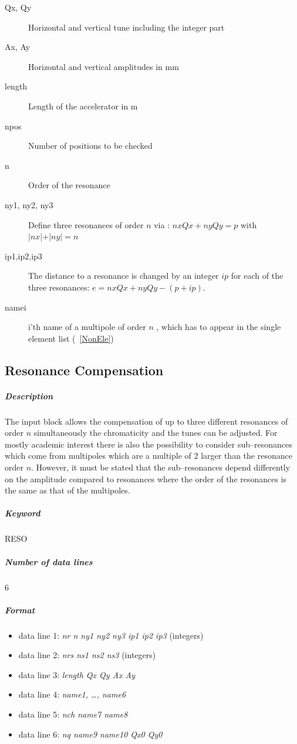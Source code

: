 \documentclass[a4paper,11pt]{report}
\begin{document}
\begin{description}
\item [Qx, Qy] Horizontal and vertical tune including the integer part
\item [Ax, Ay] Horizontal and vertical amplitudes in mm
\item [length] Length of the accelerator in m
\item [npos] Number of positions to be checked
\item [n] Order of the resonance
\item [ny1, ny2, ny3] Define three resonances of order $n$ via :
  \mbox{$ nx Qx + ny Qy = p $} with \mbox{$ \vert nx \vert + \vert ny
    \vert = n $}
\item [ip1,ip2,ip3] The distance to a resonance is changed by an
  integer $ip$ for each of the three resonances: \mbox{$ e = nx Qx +
    ny Qy - (p + ip) $.}
\item [namei] i'th name of a multipole of order $n$ , which has to
  appear in the single element list (~\ref{NonEle})
\end{description}

\subsection{Resonance Compensation} \label{ResCom}

\subparagraph{Description} The input block allows the compensation of
up to three different resonances of order $n$ simultaneously the
chromaticity and the tunes can be adjusted. For mostly academic
interest there is also the possibility to consider sub--resonances
which come from multipoles which are a multiple of 2 larger than the
resonance order $n$. However, it must be stated that the
sub--resonances depend differently on the amplitude compared to
resonances where the order of the resonances is the same as that of
the multipoles.

\subparagraph{Keyword} RESO \subparagraph{Number of data lines} 6

\subparagraph{Format}
\begin{itemize}
\item data line 1: {\em nr n ny1 ny2 ny3 ip1 ip2 ip3} \/(integers)
\item data line 2: {\em nrs ns1 ns2 ns3} \/(integers)
\item data line 3: {\em length Qx Qy Ax Ay}
\item data line 4: {\em name1, \dots, name6}
\item data line 5: {\em nch name7 name8}
\item data line 6: {\em nq name9 name10 Qx0 Qy0}
\end{itemize}
\end{document}

